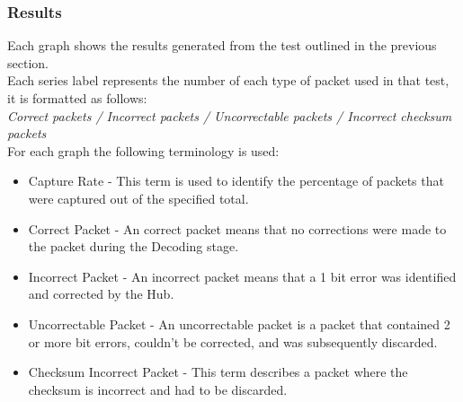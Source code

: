 \documentclass[preprint,12pt,3p]{elsarticle}
\begin{document}
\subsubsection{Results}
Each graph shows the results generated from the test outlined in the previous section.\\
Each series label represents the number of each type of packet used in that test, it is formatted as follows:\\[5pt]
\textit{Correct packets / Incorrect packets / Uncorrectable packets / Incorrect checksum packets}\\[5pt]
For each graph the following terminology is used:
\begin{itemize}
\item Capture Rate - This term is used to identify the percentage of packets that were captured out of the specified total.
\item Correct Packet - An correct packet means that no corrections were made to the packet during the Decoding stage.
\item Incorrect Packet - An incorrect packet means that a 1 bit error was identified and corrected by the Hub.
\item Uncorrectable Packet - An uncorrectable packet is a packet that contained 2 or more bit errors, couldn't be corrected, and was subsequently discarded.
\item Checksum Incorrect Packet - This term describes a packet where the checksum is incorrect and had to be discarded.

\end{itemize}
\end{document}
